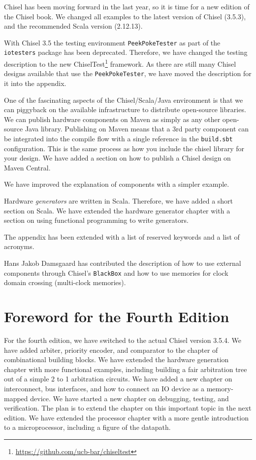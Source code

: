 \documentclass[%
    10pt,
    headinclude, footexclude,
    openright, %
    notitlepage,
    cleardoubleempty,
    headsepline,
    pointlessnumbers,
    bibtotoc, idxtotoc,
    ]{scrbook}
\newcommand{\code}[1]{{\lstinline[basicstyle=\small\ttfamily]{#1}}}
\newcommand{\myref}[2]{\href{#1}{#2}}
\renewcommand{\myref}[2]{{#2}{\footnote{\url{#1}}}}
\begin{document}
Chisel has been moving forward in the last year, so it is time for a new edition of the Chisel book.
We changed all examples to the latest version of Chisel (3.5.3), and the recommended
Scala version (2.12.13).

With Chisel 3.5 the testing environment \code{PeekPokeTester} as part of the \code{iotesters}
package has been deprecated. Therefore, we have changed the testing description to the new
\myref{https://github.com/ucb-bar/chiseltest}{ChiselTest} framework.
As there are still many Chisel designs available that use the \code{PeekPokeTester},
we have moved the description for it into the appendix.

One of the fascinating aspects of the Chisel/Scala/Java environment is that we
can piggyback on the available infrastructure to distribute open-source libraries.
We can publish hardware components on Maven as simply as any other open-source Java library.
Publishing on Maven means that a 3rd party component can be integrated into the
compile flow with a single reference in the \code{build.sbt} configuration.
This is the same process as how you include the chisel library for your design.
We have added a section on how to publish a Chisel design on Maven Central.

We have improved the explanation of components with a simpler example.

Hardware \emph{generators} are written in Scala. Therefore, we have added a short
section on Scala. We have extended the hardware generator chapter with a section
on using functional programming to write generators.

The appendix has been extended with a list of reserved keywords and a list
of acronyms.

Hans Jakob Damsgaard has contributed the description of how to use external components through Chisel's \code{BlackBox} and how to use memories for clock domain crossing (multi-clock memories).

\section*{Foreword for the Fourth Edition}

For the fourth edition, we have switched to the actual Chisel version 3.5.4.
We have added arbiter, priority encoder, and comparator to the chapter of
combinational building blocks.
We have extended the hardware generation chapter with more functional
examples, including building a fair arbitration tree out of a simple 2 to 1
arbitration circuits.
We have added a new chapter on interconnect, bus interfaces,
and how to connect an IO device as a memory-mapped device.
We have started a new chapter on debugging, testing, and verification.
The plan is to extend the chapter on this important topic in the next edition.
We have extended the processor chapter with a more gentle introduction
to a microprocessor, including a figure of the datapath.
\end{document}

